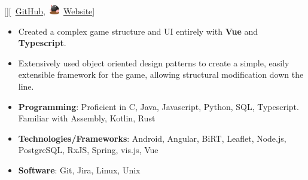 \documentclass{article}
\begin{document}
[][\faGithub\
	\href{https://github.com/kinseyda/moles}{GitHub},\
	\includegraphics[height=1.5ex]{mole-icon-small.png}\
	\href{https://kinseyda.github.io/moles/}{Website}]

\begin{itemize}
	\item Created a complex game structure and UI entirely with \textbf{Vue} and
	      \textbf{Typescript}.
	\item Extensively used object oriented design patterns to create a simple,
	      easily extensible framework for the game, allowing structural
	      modification down the line.
\end{itemize}

\vspace*{\fill}


\begin{itemize}
	\item \textbf{Programming}: Proficient in C, Java, Javascript, Python, SQL,
	      Typescript. Familiar with Assembly, Kotlin, Rust
	\item \textbf{Technologies/Frameworks}: Android, Angular, BiRT, Leaflet,
	      Node.js, PostgreSQL, RxJS, Spring, vis.js, Vue
	\item \textbf{Software}: Git, Jira, Linux, Unix
\end{itemize}
\end{document}
